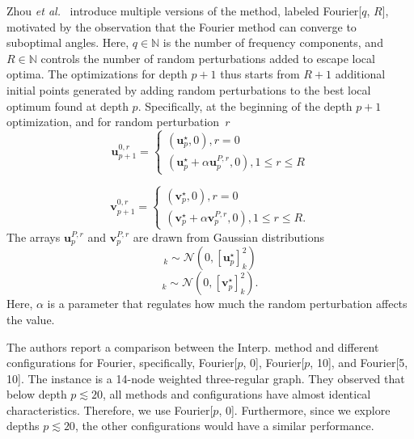 \documentclass[twocolumn,
english,
aps,
pra,
10pt,
longbibliography,
superscriptaddress,
amsmath,
amssymb,
floatfix
]{revtex4-2}
\begin{document}
{Zhou \emph{et al.}~\cite{Zhou2020} introduce multiple versions of the method, labeled Fourier[$q$, $R$], motivated by the observation that the Fourier method can converge to suboptimal angles.
Here, $q\in\mathbb{N}$ is the number of frequency components, and $R\in\mathbb{N}$ controls the number of random perturbations added to escape local optima.
The optimizations for depth $p+1$ thus starts from $R+1$ additional initial points generated by adding random perturbations to the best local optimum found at depth $p$. 
Specifically, at the beginning of the depth $p+1$ optimization, and for random perturbation~$r$
\begin{equation}
\boldsymbol{u}^{0, r}_{p+1} = 
\begin{cases}
    (\boldsymbol{u}^{\star}_{p},0), r=0\\
    (\boldsymbol{u}^{\star}_{p} + \alpha\boldsymbol{u}^{P,r}_{p},0), 1\leq r\leq R
    \end{cases}
\end{equation}

\begin{equation}
\boldsymbol{v}^{0, r}_{p+1} = 
\begin{cases}
    (\boldsymbol{v}^{\star}_{p},0), r=0\\
    (\boldsymbol{v}^{\star}_{p} + \alpha\boldsymbol{v}^{P,r}_{p},0), 1\leq r\leq R.
    \end{cases} 
\end{equation}
The arrays $\boldsymbol{u}_p^{P,r}$ and $\boldsymbol{v}_p^{P,r}$ are drawn from Gaussian distributions
\begin{equation}
    [\boldsymbol{u}^{P,r}_p]_k \sim \mathcal{N}(0,[\boldsymbol{u}^{\star}_p]^2_k)
\end{equation}
\begin{equation}
    [\boldsymbol{v}^{P,r}_p]_k \sim \mathcal{N}(0,[\boldsymbol{v}^{\star}_p]^2_k).
\end{equation}
Here, $\alpha$ is a parameter that regulates how much the random perturbation affects the value. 

The authors report a comparison between the Interp. method and different configurations for Fourier, specifically, Fourier[$p$, 0], Fourier[$p$, 10], and Fourier[5, 10].
The instance is a 14-node weighted three-regular graph. 
They observed that below depth $p \lesssim 20$, all methods and configurations have almost identical characteristics. 
Therefore, we use Fourier[$p$, 0].
Furthermore, since we explore depths $p \lesssim 20$, the other configurations would have a similar performance.

}
\end{document}
